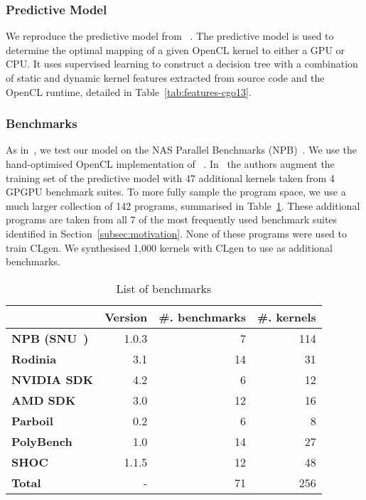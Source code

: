 \subsubsection{Predictive Model} We reproduce the predictive model from \citeauthor{Grewe2013}~\cite{Grewe2013}. The predictive model is used to determine the optimal mapping of a given OpenCL kernel to either a GPU or CPU. It uses supervised learning to construct a decision tree with a combination of static and dynamic kernel features extracted from source code and the OpenCL runtime, detailed in Table~\ref{tab:features-cgo13}.

\subsubsection{Benchmarks} As in~\cite{Grewe2013}, we test our model on the NAS Parallel Benchmarks (NPB)~\cite{Bailey1991a}. We use the hand-optimised OpenCL implementation of \citeauthor{Seo2011}~\cite{Seo2011}. In~\cite{Grewe2013} the authors augment the training set of the predictive model with 47 additional kernels taken from 4 GPGPU benchmark suites.  To more fully sample the program space, we use a much larger collection of 142 programs, summarised in Table~\ref{tab:benchmarks}. These additional programs are taken from all 7 of the most frequently used benchmark suites identified in Section~\ref{subsec:motivation}. None of these programs were used to train CLgen. We synthesised 1,000 kernels with CLgen to use as additional benchmarks.

\begin{table}%
  \centering%
  \begin{tabular}{l r r r}
    \toprule
    & \textbf{Version} & \textbf{\#. benchmarks} & \textbf{\#. kernels}\\
    \midrule
    \textbf{NPB (SNU~\cite{Seo2011})} & 1.0.3 & 7 & 114 \\
    \textbf{Rodinia~\cite{Che2009}} & 3.1 & 14 & 31 \\
    \textbf{NVIDIA SDK} & 4.2 & 6 & 12 \\
    \textbf{AMD SDK} & 3.0 & 12 & 16 \\
    \textbf{Parboil~\cite{Stratton2012}} & 0.2 & 6 & 8 \\
    \textbf{PolyBench~\cite{Grauer-Gray2012}} & 1.0 & 14 & 27 \\
    \textbf{SHOC~\cite{Danalis2010}} & 1.1.5 & 12 & 48 \\
    \textbf{Total} & - & 71 & 256 \\
  \end{tabular}
  \caption[List of benchmarks]{List of benchmarks} %
  \label{tab:benchmarks} %
\end{table}

